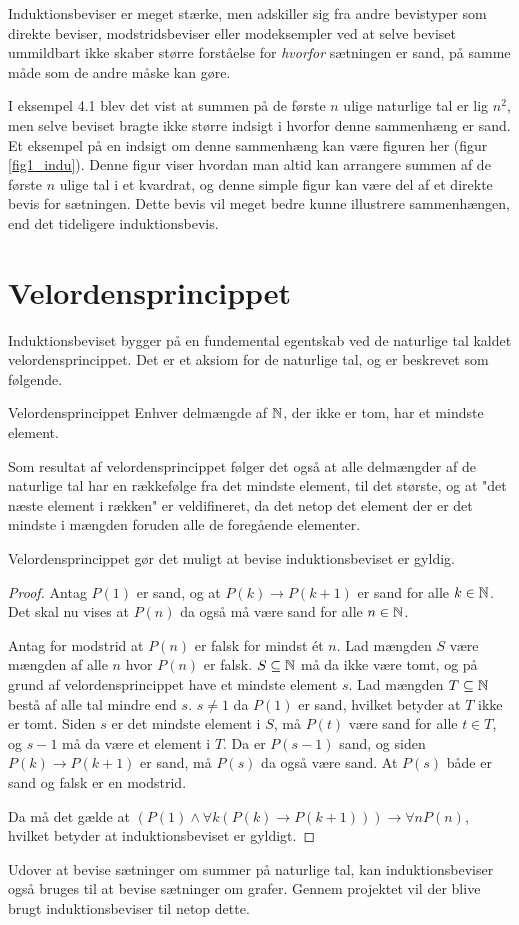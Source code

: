 Induktionsbeviser er meget stærke, men adskiller sig fra andre bevistyper som direkte beviser, modstridsbeviser eller modeksempler ved at selve beviset ummildbart ikke skaber større forståelse for \textit{hvorfor} sætningen er sand, på samme måde som de andre måske kan gøre.

I eksempel 4.1 blev det vist at summen på de første $n$ ulige naturlige tal er lig $n^2$, men selve beviset bragte ikke større indsigt i hvorfor denne sammenhæng er sand.
Et eksempel på en indsigt om denne sammenhæng kan være figuren her (figur \ref{fig1_indu}).
Denne figur viser hvordan man altid kan arrangere summen af de første $n$ ulige tal i et kvardrat, og denne simple figur kan være del af et direkte bevis for sætningen.
Dette bevis vil meget bedre kunne illustrere sammenhængen, end det tideligere induktionsbevis.

\section{Velordensprincippet}
Induktionsbeviset bygger på en fundemental egentskab ved de naturlige tal kaldet velordensprincippet.
Det er et aksiom for de naturlige tal, og er beskrevet som følgende.
\begin{theorembox}{Velordensprincippet}
	Enhver delmængde af $\mathbb{N}$, der ikke er tom, har et mindste element.
\end{theorembox}
\noindent Som resultat af velordensprincippet følger det også at alle delmængder af de naturlige tal har en rækkefølge fra det mindste element, til det største, og at "det næste element i rækken" er veldifineret, da det netop det element der er det mindste i mængden foruden alle de foregående elementer.

Velordensprincippet gør det muligt at bevise induktionsbeviset er gyldig.
\begin{proof}
	Antag $P(1)$ er sand, og at $P(k) \to P(k + 1)$ er sand for alle $k \in \mathbb{N}$.
	Det skal nu vises at $P(n)$ da også må være sand for alle $n \in \mathbb{N}$.

	Antag for modstrid at $P(n)$ er falsk for mindst ét $n$.
	Lad mængden $S$ være mængden af alle $n$ hvor $P(n)$ er falsk.
	$S \subseteq \mathbb{N}$ må da ikke være tomt, og på grund af velordensprincippet have et mindste element $s$.
	Lad mængden $T \subseteq \mathbb{N}$ bestå af alle tal mindre end $s$. $s \neq 1$ da $P(1)$ er sand, hvilket betyder at $T$ ikke er tomt.
	Siden $s$ er det mindste element i $S$, må $P(t)$ være sand for alle $t \in T$, og $s - 1$ må da være et element i $T$.
	Da er $P(s-1)$ sand, og siden $P(k) \to P(k+1)$ er sand, må $P(s)$ da også være sand.
	At $P(s)$ både er sand og falsk er en modstrid.

	Da må det gælde at $(P(1) \land \forall k ( P(k) \to P(k + 1))) \to \forall n P(n)$, hvilket betyder at induktionsbeviset er gyldigt.
\end{proof}
Udover at bevise sætninger om summer på naturlige tal, kan induktionsbeviser også bruges til at bevise sætninger om grafer.
Gennem projektet vil der blive brugt induktionsbeviser til netop dette.
